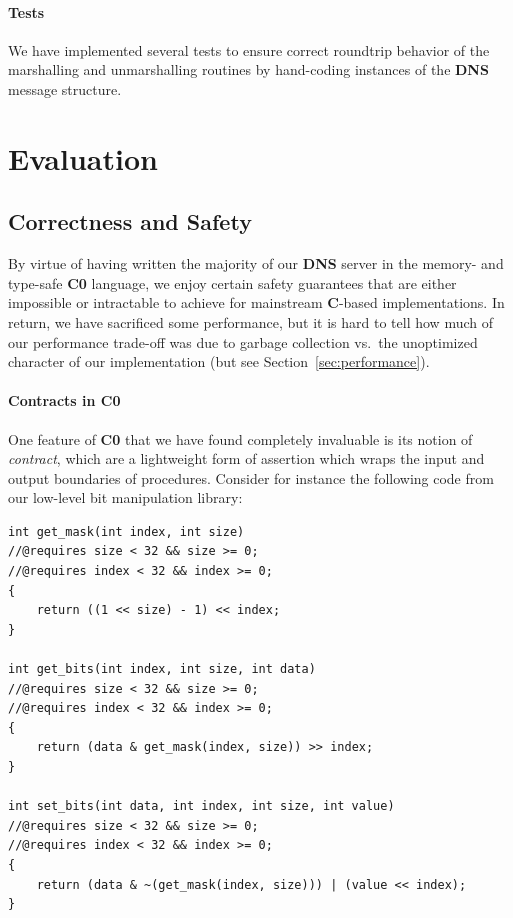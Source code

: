 \documentclass{article}
\newcommand\Kwd[1]{{\sffamily\bfseries{#1}}}
\begin{document}
\paragraph{Tests}

We have implemented several tests to ensure correct roundtrip behavior
of the marshalling and unmarshalling routines by hand-coding instances
of the \Kwd{DNS} message structure.

\section{Evaluation}

\subsection{Correctness and Safety}

By virtue of having written the majority of our \Kwd{DNS} server in
the memory- and type-safe \Kwd{C0} language, we enjoy certain safety
guarantees that are either impossible or intractable to achieve for
mainstream \Kwd{C}-based implementations. In return, we have sacrificed
some performance, but it is hard to tell how much of our performance
trade-off was due to garbage collection vs.\ the unoptimized character of
our implementation (but see Section~\ref{sec:performance}).

\paragraph{Contracts in \Kwd{C0}}

One feature of \Kwd{C0} that we have found completely invaluable is
its notion of \emph{contract}, which are a lightweight form of
assertion which wraps the input and output boundaries of
procedures. Consider for instance the following code from our
low-level bit manipulation library:

\begin{lstlisting}
int get_mask(int index, int size)
//@requires size < 32 && size >= 0;
//@requires index < 32 && index >= 0;
{
    return ((1 << size) - 1) << index;
}

int get_bits(int index, int size, int data)
//@requires size < 32 && size >= 0;
//@requires index < 32 && index >= 0;
{
    return (data & get_mask(index, size)) >> index;
}

int set_bits(int data, int index, int size, int value)
//@requires size < 32 && size >= 0;
//@requires index < 32 && index >= 0;
{
    return (data & ~(get_mask(index, size))) | (value << index);
}
\end{lstlisting}
\end{document}

